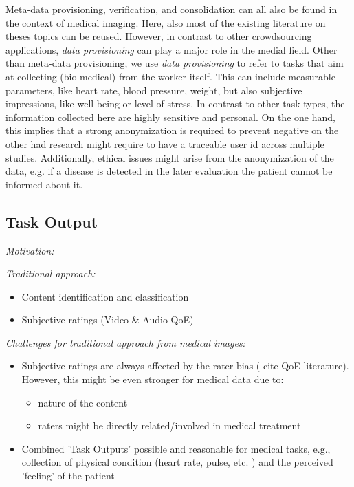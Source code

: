 \documentclass[10pt,twocolumn,letterpaper]{article}
\begin{document}
Meta-data provisioning, verification, and consolidation can all also be found in the context of medical imaging.
Here, also most of the existing literature on theses topics can be reused.
However, in contrast to other crowdsourcing applications, \emph{data provisioning} can play a major role in the medial field.
Other than meta-data provisioning, we use \emph{data provisioning} to refer to tasks that aim at collecting (bio-medical) from the worker itself.
This can include measurable parameters, like heart rate, blood pressure, weight, but also subjective impressions, like well-being or level of stress.
In contrast to other task types, the information collected here are highly sensitive and personal.
On the one hand, this implies that a strong anonymization is required to prevent negative on the other had research might require to have a traceable user id across multiple studies.
Additionally, ethical issues might arise from the anonymization of the data, e.g. if a disease is detected in the later evaluation the patient cannot be informed about it.





\subsection{Task Output}
\emph{Motivation:} 

\emph{Traditional approach:}
\begin{itemize}
    \item Content identification and classification
    \item Subjective ratings (Video \& Audio QoE)
\end{itemize}

\emph{Challenges for traditional approach from medical images:}
\begin{itemize}
    \item Subjective ratings are always affected by the rater bias ( cite QoE literature). However, this might be even stronger for medical data due to: 
        \begin{itemize}
            \item nature of the content
            \item raters might be directly related/involved in medical treatment
        \end{itemize}
    \item Combined 'Task Outputs' possible and reasonable for medical tasks, e.g., collection of physical condition (heart rate, pulse, etc. ) and the perceived 'feeling' of the patient
\end{itemize}
\end{document}
